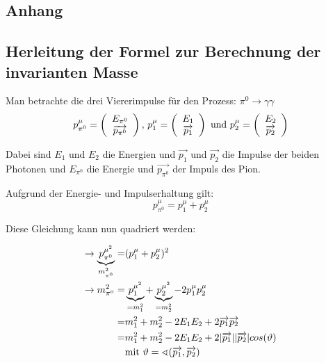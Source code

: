\documentclass[a4paper,11pt,oneside,final,german,openbib,pdftex]{scrbook}
\begin{document}
{%
\begin{appendix}
\chapter{Anhang}
\section{Herleitung der Formel zur Berechnung der invarianten Masse}
\label{sec:Herleitung-der-Formel-zur-Berechnung-der-invarianten-Masse}

Man betrachte die drei Viererimpulse f\"ur den Prozess: $\pi^0\rightarrow \gamma\gamma $
\begin{equation}
p_{\pi^0}^{\mu}=\left(\begin{array}{c}E_{\pi^0}\\\overrightarrow{p_{\pi^0}}\end{array}\right) \textnormal{,  }
p_{1}^{\mu}=\left(\begin{array}{c}E_{1}\\\overrightarrow{p_{1}}\end{array}\right) \textnormal{ und  } p_{2}^{\mu}=\left(\begin{array}{c}E_{2}\\\overrightarrow{p_{2}}\end{array}\right)
\end{equation}

Dabei sind $E_{1}$ und $E_{2}$ die Energien und $\overrightarrow{p_{1}}$ und $\overrightarrow{p_{2}}$ die Impulse der beiden Photonen und $E_{\pi^0}$ die Energie und $\overrightarrow{p_{\pi^0}}$ der Impuls des Pion.

Aufgrund der Energie- und Impulserhaltung gilt:
\begin{equation}
p^{\mu}_{\pi^0} = p^{\mu}_1 + p^{\mu}_2
\end{equation}

Diese Gleichung kann nun quadriert werden:

\begin{equation}
\begin{split}
\rightarrow \underbrace{p^{\mu^2}_{\pi^0}}_{m_{\pi^0}^2}=& (p_{1}^{\mu}+p_{2}^{\mu})^2 \\ 
\rightarrow m_{\pi^0}^2=& \underbrace{p_{1}^{\mu^2}}_{=m_1^2}+\underbrace{p_{2}^{\mu^2}}_{=m_2^2}-2p_{1}^{\mu}p_{2}^{\mu} \\ 
=& m_1^2+m_2^2-2E_1E_2+2\overrightarrow{p_1}\overrightarrow{p_2} \\ 
=& m_1^2+m_2^2-2E_1E_2+2|\overrightarrow{p_1}| |\overrightarrow{p_2}| cos(\vartheta) \\
&\textnormal{mit } \vartheta=\sphericalangle(\overrightarrow{p_1},\overrightarrow{p_2})
\end{split}
\end{equation}


\end{appendix}}
\end{document}

